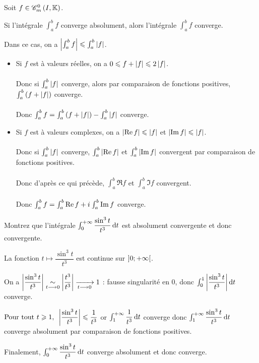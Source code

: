 \begin{theo}
Soit \(f\in\contm[I]\).

Si l'intégrale \(\int_a^bf\) converge absolument, alors l'intégrale \(\int_a^bf\) converge.

Dans ce cas, on a \(\left\lvert\int_a^bf\right\rvert\leqslant\int_a^b\left\lvert f\right\rvert\).
\end{theo}

\begin{dem}
\begin{itemize}
    \item Si \(f\) est à valeurs réelles, on a \(0\leqslant f+\left\lvert f\right\rvert\leqslant2\left\lvert f\right\rvert\). \\\\ Donc si \(\int_a^b\left\lvert f\right\rvert\) converge, alors par comparaison de fonctions positives, \(\int_a^b\left(f+\left\lvert f\right\rvert\right)\) converge. \\\\ Donc \(\int_a^bf=\int_a^b\left(f+\left\lvert f\right\rvert\right)-\int_a^b\left\lvert f\right\rvert\) converge. \\
    \item Si \(f\) est à valeurs complexes, on a \(\left\lvert\operatorname{Re} f\right\rvert\leqslant\left\lvert f\right\rvert\) et \(\left\lvert\operatorname{Im} f\right\rvert\leqslant\left\lvert f\right\rvert\). \\\\ Donc si \(\int_a^b\left\lvert f\right\rvert\) converge, \(\int_a^b\left\lvert\operatorname{Re} f\right\rvert\) et \(\int_a^b\left\lvert\operatorname{Im} f\right\rvert\) convergent par comparaison de fonctions positives. \\\\ Donc d'après ce qui précède, \(\int_a^b\Re f\) et \(\int_a^b\Im f\) convergent. \\\\ Donc \(\int_a^bf=\int_a^b\operatorname{Re} f+i\mkern1mu\int_a^b\operatorname{Im} f\) converge.
\end{itemize}
\end{dem}

\begin{exo}
Montrez que l'intégrale \(\int_0^{\pinf}\dfrac{\sin^3t}{t^3}\odif{t}\) est absolument convergente et donc convergente.
\end{exo}

\begin{corr}
La fonction \(t\mapsto\dfrac{\sin^3t}{t^3}\) est continue sur \(\left]0;+\infty\right[\).

On a \(\left\lvert\dfrac{\sin^3t}{t^3}\right\rvert\underset{t\longrightarrow0}{\sim}\left\lvert\dfrac{t^3}{t^3}\right\rvert\xrightarrow[t\longrightarrow0]{}1\) : fausse singularité en \(0\), donc \(\int_0^1\abs{\dfrac{\sin^3t}{t^3}}\odif{t}\) converge.

\(\quantifs{\Tpt t\geq1}\abs{\dfrac{\sin^3t}{t^3}}\leq\dfrac{1}{t^3}\) or \(\int_1^{\pinf}\dfrac{1}{t^3}\odif{t}\) converge donc \(\int_1^{\pinf}\dfrac{\sin^3t}{t^3}\odif{t}\) converge absolument par comparaison de fonctions positives.

Finalement, \(\int_0^{\pinf}\dfrac{\sin^3t}{t^3}\odif{t}\) converge absolument et donc converge.
\end{corr}

